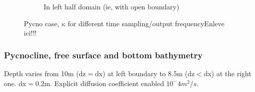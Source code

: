 \begin{figure}
\begin{subfigure}{.5\textwidth}
\caption{In left half domain (ie, with open boundary)}
\end{subfigure}
\caption{Pycno case, $\kappa$ for different time sampling/output frequency\color{red}Enleve ici!!!\color{black}}
\end{figure}

\subsubsection{Pycnocline, free surface and bottom bathymetry}

Depth varies from 10m (dz$=$dx) at left boundary to 8.5m (dz$<$dx) at the right one. dx$=$0.2m. Explicit diffusion coefficient enabled $10^-4m^2/s$.

\begin{figure}[h!]


\end{figure}
